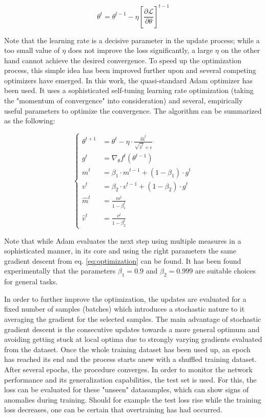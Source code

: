 \begin{equation}
	\theta^t = \theta^{t-1}-\eta\left[\frac{\partial \mathcal{L}}{\partial\theta}\right]^{t-1}
	\label{eq:optimization}
\end{equation}

Note that the learning rate is a decisive parameter in the update process; while a too small value of $\eta$ does not improve the loss significantly, a large $\eta$ on the other hand cannot achieve the desired convergence. To speed up the optimization process, this simple idea has been improved further upon and several competing optimizers have emerged. In this work, the quasi-standard Adam optimizer \cite{Adam_paper} has been used. It uses a sophisticated self-tuning learning rate optimization (taking the "momentum of convergence" into consideration) and several, empirically useful parameters to optimize the convergence. The algorithm can be summarized as the following:

\begin{equation*}
	\begin{cases}
			\theta^{t+1} &= \theta^t - \eta \cdot \frac{\hat{m}^t}{\sqrt{\hat{v}^t}+\epsilon}\\
			g^t &=\nabla_\theta f^t (\theta^{t-1})\\
			m^t&=\beta_1 \cdot m^{t-1} + (1-\beta_1) \cdot g^t \\
			v^t&=\beta_2 \cdot v^{t-1} + (1-\beta_2) \cdot g^t \\
			\hat{m}^t&=\frac{m^t}{1-\beta^t_1}\\
			\hat{v}^t&=\frac{v^t}{1-\beta^t_2}
	\end{cases}
\end{equation*}

Note that while Adam evaluates the next step using multiple measures in a sophisticated manner, in its core and using the right parameters the same gradient descent from eq. \ref{eq:optimization} can be found. It has been found experimentally that the parameters $\beta_1 = 0.9$ and $\beta_2 = 0.999$ are suitable choices for general tasks.

In order to further improve the optimization, the updates are evaluated for a fixed number of samples (batches) which introduces a stochastic nature to it averaging the gradient for the selected samples. The main advantage of stochastic gradient descent is the consecutive updates towards a more general optimum and avoiding getting stuck at local optima due to strongly varying gradients evaluated from the dataset.
Once the whole training dataset has been used up, an epoch has reached its end and the process starts anew with a shuffled training dataset. After several epochs, the procedure converges.
In order to monitor the network performance and its generalization capabilities, the test set is used. For this, the loss can be evaluated for these "unseen" datasamples, which can show signs of anomalies during training. Should for example the test loss rise while the training loss decreases, one can be certain that overtraining has had occurred.

